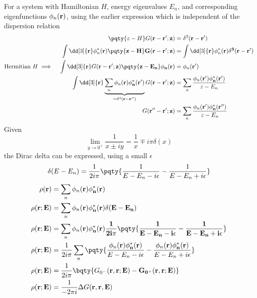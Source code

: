 \documentclass[12pt]{article}
\begin{document}
    For a system with Hamiltonian \(H\), energy eigenvalues \(E_n\), and corresponding eigenfunctions \(\phi_n(\bf r)\), using the earlier expression which is independent of the dispersion relation \begin{align*}
        \pqty{z - H} G(\bf r - \bf r';z) &= \delta^3(\bf r - \bf r')\\
        \int \dd[3]{\bf r}\phi_n^*(\bf r)\pqty{z - H}  G(\bf r - \bf r';z) &= \int \dd[3]{\bf r}\phi_n^*(\bf r) \delta^3(\bf r - \bf r') \\
        \text{Hermitian }H\implies\quad  \int \dd[3]{\bf r}G(\bf r - \bf r';z)\pqty{z - E_n} \phi_n(\bf r)  &= \phi_n(\bf r')\\
        \int \dd[3]{\bf r}\underbrace{\sum_n \phi_n(\bf r) \phi^*_n(\bf r')}_{=\delta^3(\bf r - \bf r'')} G(\bf r - \bf r';z)   &= \sum_n\frac{\phi_n(\bf r')\phi^*_n(\bf r')}{z-E_n} \\
        G(\bf r'' - \bf r';z)   &= \sum_n\frac{\phi_n(\bf r')\phi^*_n(\bf r'')}{z-E_n} 
    \end{align*}
    Given\[
        \lim_{y \to 0^ + } \frac{1}{x \pm iy} = \frac{1}{x} \mp i\pi \delta(x)
    \]
    the Dirac delta can be expressed, using a small \(\epsilon\) \[
        \delta(E - E_n) = \frac{1}{2i\pi} \pqty{\frac{1}{E -E_n - i\epsilon} - \frac{1}{E - E_n + i\epsilon}}
    \]
    \begin{align*}
        \rho(\bf r) &= \sum_n \phi_n(\bf r) \phi^*_n(\bf r) \\
        \rho(\bf r; E) &= \sum_n \phi_n(\bf r) \phi^*_n(\bf r) \delta(E - E_n)\\
        \rho(\bf r; E) &= \sum_n \phi_n(\bf r) \phi^*_n(\bf r) \frac{1}{2i\pi} \pqty{\frac{1}{E -E_n - i\epsilon} - \frac{1}{E - E_n + i\epsilon}}\\
        \rho(\bf r; E) &= \frac{1}{2i\pi}\sum_n   \pqty{\frac{\phi_n(\bf r) \phi^*_n(\bf r)}{E -E_n - i\epsilon} - \frac{\phi_n(\bf r) \phi^*_n(\bf r)}{E - E_n + i\epsilon}}\\
        \rho(\bf r; E) &= \frac{1}{2i\pi}  \bqty{G_{0^ -}(\bf r, \bf r;E) - G_{0^ +}(\bf r, \bf r;E)}\\
        \rho(\bf r; E) &= \frac{1}{ - 2\pi i} \Delta G(\bf r, \bf r, E)
    \end{align*}
\end{document}
